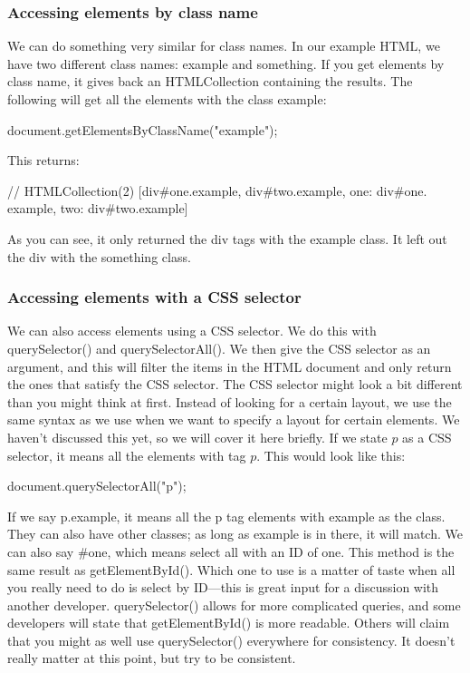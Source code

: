 \documentclass{report}
\begin{document}
\begin{jscode}
\bigbreak \noindent 
\subsubsection{Accessing elements by class name}
\bigbreak \noindent 
We can do something very similar for class names. In our example HTML, we have
two different class names: example and something. If you get elements by class name,
it gives back an HTMLCollection containing the results. The following will get all
the elements with the class example:
\bigbreak \noindent 
\begin{jscode}
    document.getElementsByClassName("example");
\end{jscode}
\bigbreak \noindent 
This returns:
\bigbreak \noindent 
\begin{jscode}
// HTMLCollection(2) [div#one.example, div#two.example, one: div#one. example, two: div#two.example]
\end{jscode}
\bigbreak \noindent 
As you can see, it only returned the div tags with the example class. It left out the div with the something class.
\bigbreak \noindent 
\subsubsection{Accessing elements with a CSS selector}
\bigbreak \noindent 
We can also access elements using a CSS selector. We do this with querySelector()
and querySelectorAll(). We then give the CSS selector as an argument, and this
will filter the items in the HTML document and only return the ones that satisfy the
CSS selector.
\bigbreak \noindent 
The CSS selector might look a bit different than you might think at first. Instead of
looking for a certain layout, we use the same syntax as we use when we want to
specify a layout for certain elements. We haven't discussed this yet, so we will cover
it here briefly.
\bigbreak \noindent 
If we state $p$ as a CSS selector, it means all the elements with tag $p$. This would look like this:
\bigbreak \noindent 
\begin{jscode}
document.querySelectorAll("p");
\end{jscode}
\bigbreak \noindent 
If we say p.example, it means all the p tag elements with example as the class. They can also have other classes; as long as example is in there, it will match. We can also say #one, which means select all with an ID of one.
\bigbreak \noindent 
This method is the same result as getElementById(). Which one to use is a matter
of taste when all you really need to do is select by ID—this is great input for a
discussion with another developer. querySelector() allows for more complicated
queries, and some developers will state that getElementById() is more readable.
Others will claim that you might as well use querySelector() everywhere for
consistency. It doesn't really matter at this point, but try to be consistent.
\bigbreak \noindent 

\end{jscode}
\end{document}
